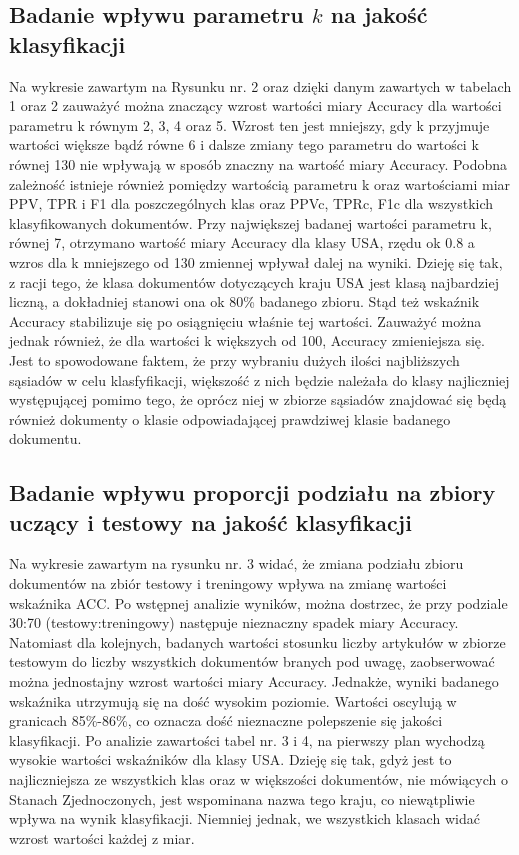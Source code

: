 \documentclass{classrep}
\begin{document}
\subsection{Badanie wpływu parametru $k$ na jakość klasyfikacji}
Na wykresie zawartym na Rysunku nr. 2 oraz dzięki danym zawartych w tabelach 1 oraz 2 zauważyć można znaczący wzrost wartości miary Accuracy dla wartości parametru k równym 2, 3, 4 oraz 5. Wzrost ten jest mniejszy, gdy k przyjmuje wartości większe bądź równe 6 i dalsze zmiany tego parametru do wartości k równej 130 nie wpływają w sposób znaczny na wartość miary Accuracy. Podobna zależność istnieje również pomiędzy wartością parametru k oraz wartościami miar PPV, TPR i F1 dla poszczególnych klas oraz PPVc, TPRc, F1c dla wszystkich klasyfikowanych dokumentów. Przy największej badanej wartości parametru k, równej 7, otrzymano wartość miary Accuracy dla klasy USA, rzędu ok 0.8 a wzros dla k mniejszego od 130 zmiennej wpływał dalej na wyniki. Dzieję się tak, z racji tego, że klasa dokumentów dotyczących kraju USA jest klasą najbardziej liczną, a dokładniej stanowi ona ok 80\% badanego zbioru. Stąd też wskaźnik Accuracy stabilizuje się po osiągnięciu właśnie tej wartości. Zauważyć można jednak również, że dla wartości k większych od 100, Accuracy zmieniejsza się. Jest to spowodowane faktem, że przy wybraniu dużych ilości najbliższych sąsiadów w celu klasfyfikacji, większość z nich będzie należała do klasy najliczniej występującej pomimo tego, że oprócz niej w zbiorze sąsiadów znajdować się będą również dokumenty o klasie odpowiadającej prawdziwej klasie badanego dokumentu.
\\
\subsection{Badanie wpływu proporcji podziału na zbiory uczący i testowy na jakość klasyfikacji}
Na wykresie zawartym na rysunku nr. 3 widać, że zmiana podziału zbioru dokumentów na zbiór testowy i treningowy wpływa na zmianę wartości wskaźnika ACC. Po wstępnej analizie wyników, można dostrzec, że przy podziale 30:70 (testowy:treningowy) następuje nieznaczny spadek miary Accuracy. Natomiast dla kolejnych, badanych wartości stosunku liczby artykułów w zbiorze testowym do liczby wszystkich dokumentów branych pod uwagę, zaobserwować można jednostajny wzrost wartości miary Accuracy. Jednakże, wyniki badanego wskaźnika utrzymują się na dość wysokim poziomie. Wartości oscylują w granicach 85\%-86\%, co oznacza dość nieznaczne polepszenie się jakości klasyfikacji. Po analizie zawartości tabel nr. 3 i 4, na pierwszy plan wychodzą wysokie wartości wskaźników dla klasy USA. Dzieję się tak, gdyż jest to najliczniejsza ze wszystkich klas oraz w większości dokumentów, nie mówiących o Stanach Zjednoczonych, jest wspominana nazwa tego kraju, co niewątpliwie wpływa na wynik klasyfikacji. Niemniej jednak, we wszystkich klasach widać wzrost wartości każdej z miar.
\\
\end{document}
